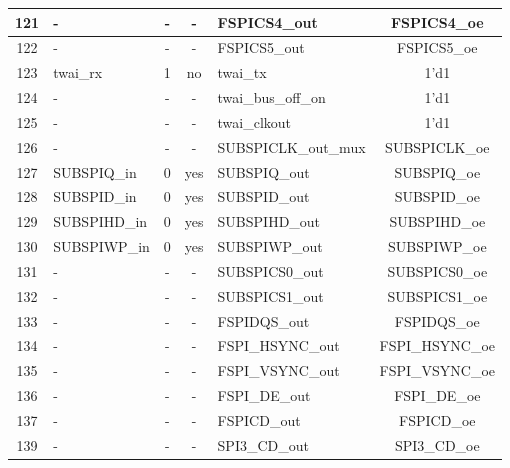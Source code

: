 \begin{longtable}[c]{|c|l|c|c|l|c|}
121  &                        -  &  -  &    -  &            FSPICS4\_out  &        FSPICS4\_oe  \\\hline
122  &                        -  &  -  &    -  &            FSPICS5\_out  &        FSPICS5\_oe  \\\hline
123  &                  twai\_rx  &  1  &   no  &                 twai\_tx  &               1'd1  \\\hline
124  &                        -  &  -  &    -  &       twai\_bus\_off\_on  &               1'd1  \\\hline
125  &                        -  &  -  &    -  &             twai\_clkout  &               1'd1  \\\hline
126  &                        -  &  -  &    -  &     SUBSPICLK\_out\_mux  &      SUBSPICLK\_oe  \\\hline
127  &              SUBSPIQ\_in  &  0  &  yes  &            SUBSPIQ\_out  &        SUBSPIQ\_oe  \\\hline
128  &              SUBSPID\_in  &  0  &  yes  &            SUBSPID\_out  &        SUBSPID\_oe  \\\hline
129  &             SUBSPIHD\_in  &  0  &  yes  &           SUBSPIHD\_out  &       SUBSPIHD\_oe  \\\hline
130  &             SUBSPIWP\_in  &  0  &  yes  &           SUBSPIWP\_out  &       SUBSPIWP\_oe  \\\hline
131  &                        -  &  -  &    -  &          SUBSPICS0\_out  &      SUBSPICS0\_oe  \\\hline
132  &                        -  &  -  &    -  &          SUBSPICS1\_out  &      SUBSPICS1\_oe  \\\hline
133  &                        -  &  -  &    -  &            FSPIDQS\_out  &        FSPIDQS\_oe  \\\hline
134  &                        -  &  -  &    -  &        FSPI\_HSYNC\_out  &    FSPI\_HSYNC\_oe  \\\hline
135  &                        -  &  -  &    -  &        FSPI\_VSYNC\_out  &    FSPI\_VSYNC\_oe  \\\hline
136  &                        -  &  -  &    -  &           FSPI\_DE\_out  &       FSPI\_DE\_oe  \\\hline
137  &                        -  &  -  &    -  &             FSPICD\_out  &         FSPICD\_oe  \\\hline
139  &                        -  &  -  &    -  &           SPI3\_CD\_out  &       SPI3\_CD\_oe  \\\hline

\end{longtable}
